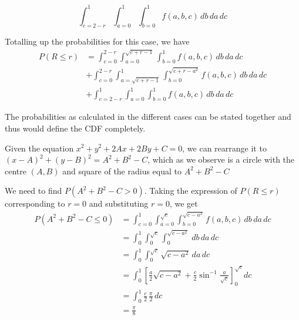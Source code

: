 \documentclass[12pt, oneside]{article}
\begin{document}
\begin{enumerate}
{\begin{enumerate}
{\begin{itemize}
{                    \[
                        \int_{c = 2 - r}^{1} \int_{a=0}^{1} 
                        \int_{b = 0}^{1} f(a, b, c)\, db\, da\, dc
                    \]
                }
            \end{itemize}

            Totalling up the probabilities for this case, we have
            \begin{align*}
                P(R \leq r) &= \int_{c = 0}^{2 - r} \int_{a=0}^{\sqrt{c + r - 1}} 
                                \int_{b = 0}^{1} f(a, b, c)\, db\, da\, dc \\
                            &+ \int_{c = 0}^{2 - r} \int_{a=\sqrt{c + r - 1}}^{1} 
                                \int_{b = 0}^{\sqrt{c + r - a^2}} f(a, b, c)\, db\, da\, dc \\
                            &+ \int_{c = 2 - r}^{1} \int_{a=0}^{1} 
                                \int_{b = 0}^{1} f(a, b, c)\, db\, da\, dc
            \end{align*}
        }
    \end{enumerate}

    The probabilities as calculated in the different cases can be stated together and
    thus would define the CDF completely.

    Given the equation \(x^2 + y^2 + 2Ax + 2By + C = 0\), we can rearrange it to
    \((x - A)^2 + (y - B)^2 = A^2 + B^2 - C\), which as we observe is a circle with the
    centre \((A, B)\) and square of the radius equal to \(A^2 + B^2 - C\)

    We need to find \(P(A^2 + B^2 - C > 0)\). Taking the expression of \(P(R \leq r)\)
    corresponding to \(r = 0\) and substituting \(r = 0\), we get
    \begin{align*}
        P(A^2 + B^2 - C \leq 0) &= \int_{c = 0}^{1} \int_{a=0}^{\sqrt{c}} 
                                    \int_{b = 0}^{\sqrt{c - a^2}} f(a, b, c)\, db\, da\, dc \\
                                &= \int_{0}^{1} \int_{0}^{\sqrt{c}} 
                                \int_{0}^{\sqrt{c - a^2}} \, db\, da\, dc \\
                                &= \int_{0}^{1} \int_{0}^{\sqrt{c}} \sqrt{c - a^2}\, da\, dc \\
                                &= \int_{0}^{1} \left[\frac{a}{2}\sqrt{c - a^2} + \frac{c}{2}
                                    \sin^{-1}{\frac{a}{\sqrt{c}}}\right]^{\sqrt{c}}_{0} dc \\
                                &= \int_{0}^{1} \frac{c}{2} \, \frac{\pi}{2} \, dc \\
                                &= \frac{\pi}{8}
    \end{align*}

}
\end{enumerate}
\end{document}
